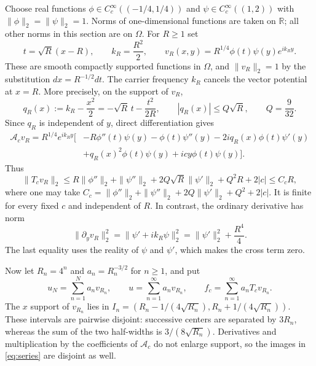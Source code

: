 \documentclass[11pt,a4paper]{article}
\begin{document}
Choose real functions
$\phi\in C_c^\infty((-1/4,1/4))$ and
$\psi\in C_c^\infty((1,2))$ with $\|\phi\|_2=\|\psi\|_2=1$.
Norms of one-dimensional functions are taken on $\mathbb R$; all other
norms in this section are on $\Omega$.
For $R\geq1$ set
\begin{equation}
 t=\sqrt R(x-R),\qquad k_R=\frac{R^2}{2},\qquad
 v_R(x,y)=R^{1/4}\phi(t)\psi(y)e^{ik_Ry}.
 \label{eq:packet}
\end{equation}
These are smooth compactly supported functions in $\Omega$, and
$\|v_R\|_2=1$ by the substitution $dx=R^{-1/2}dt$.
The carrier frequency $k_R$ cancels the vector potential at $x=R$.
More precisely, on the support of $v_R$,
\begin{equation}
 q_R(x):=k_R-\frac{x^2}{2}
       =-\sqrt R\,t-\frac{t^2}{2R},\qquad
 |q_R(x)|\leq Q\sqrt R,\qquad Q=\frac9{32}.
 \label{eq:mismatch}
\end{equation}
Since $q_R$ is independent of $y$, direct differentiation gives
\begin{equation}
\begin{split}
 \mathcal A_cv_R=R^{1/4}e^{ik_Ry}\bigl[
 &-R\phi''(t)\psi(y)-\phi(t)\psi''(y)
       -2iq_R(x)\phi(t)\psi'(y)\\
 &+q_R(x)^2\phi(t)\psi(y)+icy\phi(t)\psi(y)\bigr].
\end{split}
\label{eq:image}
\end{equation}
Thus
\begin{equation}
 \|T_cv_R\|_2
 \leq R\|\phi''\|_2+\|\psi''\|_2
       +2Q\sqrt R\|\psi'\|_2+Q^2R+2|c|
 \leq C_cR,
 \label{eq:graphbound}
\end{equation}
where one may take
$C_c=\|\phi''\|_2+\|\psi''\|_2+2Q\|\psi'\|_2+Q^2+2|c|$.
It is finite for every fixed $c$ and independent of $R$.
In contrast, the ordinary derivative has norm
\begin{equation}
 \|\partial_yv_R\|_2^2
 =\|\psi'+ik_R\psi\|_2^2
 =\|\psi'\|_2^2+\frac{R^4}{4}.
 \label{eq:ordinary}
\end{equation}
The last equality uses the reality of $\psi$ and $\psi'$, which makes the
cross term zero.

Now let $R_n=4^n$ and $a_n=R_n^{-3/2}$ for $n\geq1$, and put
\begin{equation}
 u_N=\sum_{n=1}^N a_nv_{R_n},\qquad
 u=\sum_{n=1}^\infty a_nv_{R_n},\qquad
 f_c=\sum_{n=1}^\infty a_nT_cv_{R_n}.
 \label{eq:series}
\end{equation}
The $x$ support of $v_{R_n}$ lies in
$I_n=(R_n-1/(4\sqrt{R_n}),R_n+1/(4\sqrt{R_n}))$.
These intervals are pairwise disjoint: successive centers are separated by
$3R_n$, whereas the sum of the two half-widths is $3/(8\sqrt{R_n})$.
Derivatives and multiplication by the coefficients of $\mathcal A_c$ do not
enlarge support, so the images in \eqref{eq:series} are disjoint as well.
\end{document}
